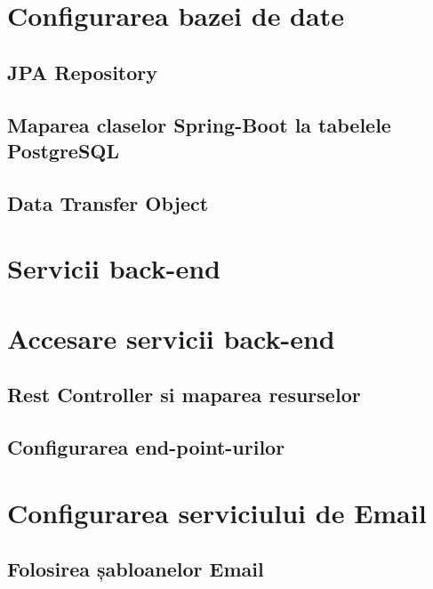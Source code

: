\documentclass[12pt,a4paper]{report}
\theoremstyle{definition}
\theoremstyle{remark}
\begin{document}
\section{Configurarea bazei de date}

\subsection{JPA Repository}

\subsection{Maparea claselor Spring-Boot la tabelele PostgreSQL}

\subsection{Data Transfer Object}

\newpage

\section{Servicii back-end}

\newpage

\section{Accesare servicii back-end}

\subsection{Rest Controller si maparea resurselor}

\subsection{Configurarea end-point-urilor}

\newpage

\section{Configurarea serviciului de Email}

\subsection{Folosirea șabloanelor Email}
\end{document}
